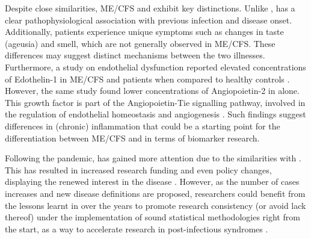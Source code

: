 Despite close similarities, ME/CFS and \LC exhibit key distinctions.
Unlike \cfs, \LC has a clear pathophysiological association with previous infection and disease onset.
Additionally, \LC patients experience unique symptoms such as changes in taste (ageusia) and smell, which are not generally observed in ME/CFS.
These differences may suggest distinct mechanisms between the two illnesses.
Furthermore, a study on endothelial dysfunction reported elevated concentrations of Edothelin-1 in ME/CFS and \LC patients when compared to healthy controls \citep{haffke2022EndothelialDysfunction}.
However, the same study found lower concentrations of Angiopoietin-2 in \LC alone.
This growth factor is part of the Angiopoietin-Tie signalling pathway, involved in the regulation of endothelial homeostasis and angiogenesis \citep{akwii2019RoleAngiopoietin2}.
Such findings suggest differences in (chronic) inflammation that could be a starting point for the differentiation between ME/CFS and \LC in terms of biomarker research.

Following the \covid pandemic, \cfs has gained more attention due to the similarities with \LC.
This has resulted in increased research funding and even policy changes, displaying the renewed interest in the disease \citep{oneill2022SajidJavid}.
However, as the number of \LC cases increases and new disease definitions are proposed, researchers could benefit from the lessons learnt in \cfs over the years to promote research consistency (or avoid lack thereof) under the implementation of sound statistical methodologies right from the start, as a way to accelerate research in post-infectious syndromes \citep{westermeier2022EditorialCurrent, jason2023WhatLong}.

